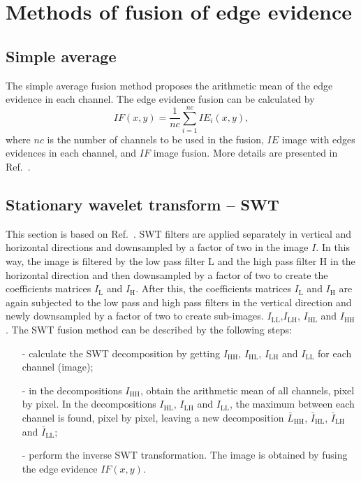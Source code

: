 \documentclass[conference]{IEEEtran}
\begin{document}
\section{Methods of fusion of edge evidence}\label{sec_07}

\subsection{Simple average}
The simple average fusion method proposes the arithmetic mean of the edge evidence in each channel. 
The edge evidence fusion can be calculated by
\begin{equation}
	IF(x,y)=\frac{1}{nc}\sum_{i=1}^{nc}IE_i(x,y),
\end{equation} 
where $nc$ is the number of channels to be used in the fusion, $IE$ image with edges evidences in each channel, and $IF$ image fusion.
More details are presented in Ref.~\cite{mit}.

\subsection{Stationary wavelet transform -- SWT} 

This section is based on Ref.~\cite{n_r}. SWT filters are applied separately in vertical and horizontal directions and downsampled by a factor of two in the image $I$. In this way, the image is filtered by the low pass filter $\text{L}$ and the high pass filter $\text{H}$ in the horizontal direction and then downsampled by a factor of two to create the coefficients matrices $I_\text{L}$ and $I_\text{H}$. After this, the coefficients matrices $I_\text{L}$ and $I_\text{H}$ are again subjected to the low pass and high pass filters in the vertical direction and newly downsampled by a factor of two to create sub-images. $ I_\text{LL}$,$I_\text{LH}$, $I_\text{HL}$ and $I_\text{HH}$.
The SWT fusion method can be described by the following steps:
\begin{itemize}
\item[-] calculate the SWT decomposition by getting $I_\text{HH}$, $I_\text{HL}$, $I_\text{LH}$ and $I_\text{LL}$ for each channel (image); %
\item[-] in the decompositions $I_\text{HH}$, obtain the arithmetic mean of all channels, pixel by pixel. In the decompositions $I_\text{HL}$, $I_\text{LH}$ and $I_\text{LL}$, the maximum between each channel is found, pixel by pixel, leaving a new decomposition $\bar{L}_\text{HH}$, $\bar{I}_\text{HL}$, $\bar{I}_\text{LH}$ and $\bar{I}_\text{LL}$;
\item[-] perform the inverse SWT transformation. The image is obtained by fusing the edge evidence $IF(x,y)$.  
\end{itemize}
\end{document}
